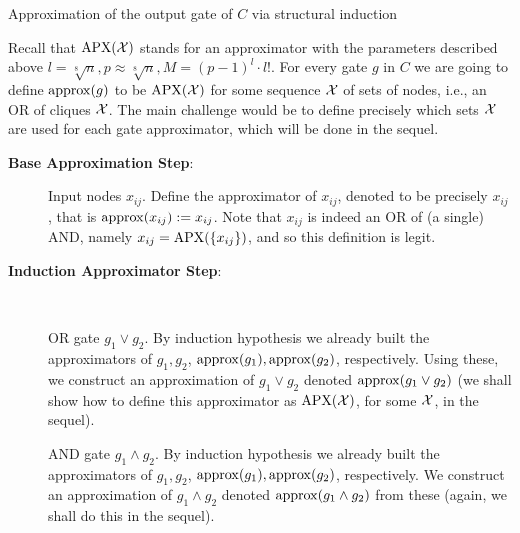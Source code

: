 \begin{trailer}
{Approximation of the output gate of $C$ via structural induction}

Recall that $\mathrm{APX}({\mathcal X})$ stands for an approximator with the parameters described above $ l=\sqrt[8]{n} , p \approx \sqrt[8]{n}, M=(p-1)^l \cdot l!$.
For every gate $g$ in $C$ we are going to define ${\rm approx}(g)$ to be $\mathrm{APX}(\mathcal{X})$ for some sequence $\mathcal{X}$ of sets of nodes, i.e., an OR of cliques $\mathcal{X}$. The main challenge would be to define precisely which sets $\mathcal{X}$ are used for each gate approximator, which will be done in the sequel.


\begin{description}
\item[\textbf{Base Approximation Step}:] 
Input nodes $x_{ij}$. Define the approximator of $x_{ij}$, denoted  to be precisely $x_{ij}$, that is ${\rm approx}(x_{ij}):=x_{ij}$.
Note that $x_{ij}$ is indeed an OR of (a single) AND, namely $x_{ij}=\mathrm{APX}(\{x_{ij}\})$, and so this definition is legit.

\item[\textbf{Induction  Approximator Step}:]\

 OR gate $g_1\lor g_2$. By induction hypothesis we already built the approximators of $g_1,g_2$, ${\rm approx}(g_1),{\rm approx}(g_2)$, respectively. Using these, we construct an approximation of $g_1\lor g_2$ denoted ${\rm approx}(g_1\lor g_2)$  (we shall show how to define this approximator as $\mathrm{APX}(\mathcal{X})$, for some $\mathcal{X}$, in the  sequel).

 AND gate $g_1\land g_2$. 
By induction hypothesis we already built the approximators 
of $g_1,g_2$, ${\rm approx}(g_1),{\rm approx}(g_2)$, respectively. 
We construct an approximation of $g_1\land g_2$ denoted 
${\rm approx}(g_1\land g_2)$ from these (again, we shall do this in the sequel).
\end{description} 
\end{trailer}




